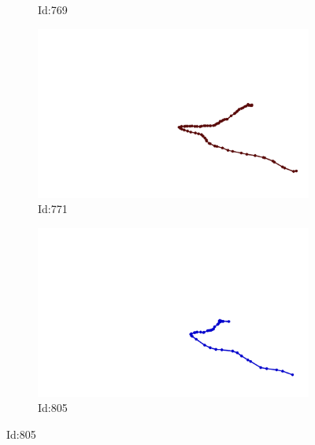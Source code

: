 \documentclass[12pt,twoside]{report}
\begin{document}
\begin{figure}
\begin{subfigure}[b]{0.20\textwidth}
\caption{Id:769}
\end{subfigure}
\begin{subfigure}[b]{0.20\textwidth}
\centering
\includegraphics[width=\textwidth]{../trajectories/771.png}
\caption{Id:771}
\end{subfigure}
\begin{subfigure}[b]{0.20\textwidth}
\centering
\includegraphics[width=\textwidth]{../trajectories/805.png}
\caption{Id:805}
\end{subfigure}
\end{figure}
\end{document}
